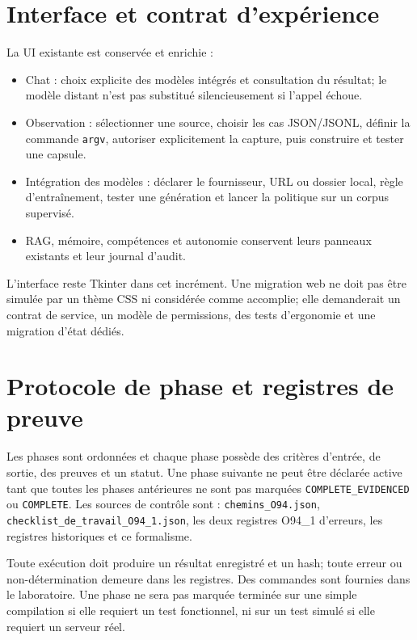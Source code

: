 \documentclass[11pt,a4paper]{article}
\begin{document}
\section{Interface et contrat d'expérience}
La UI existante est conservée et enrichie :
\begin{itemize}[nosep]
\item Chat : choix explicite des modèles intégrés et consultation du résultat; le modèle distant n'est pas substitué silencieusement si l'appel échoue.
\item Observation : sélectionner une source, choisir les cas JSON/JSONL, définir la commande \texttt{argv}, autoriser explicitement la capture, puis construire et tester une capsule.
\item Intégration des modèles : déclarer le fournisseur, URL ou dossier local, règle d'entraînement, tester une génération et lancer la politique sur un corpus supervisé.
\item RAG, mémoire, compétences et autonomie conservent leurs panneaux existants et leur journal d'audit.
\end{itemize}
L'interface reste Tkinter dans cet incrément. Une migration web ne doit pas être simulée par un thème CSS ni considérée comme accomplie; elle demanderait un contrat de service, un modèle de permissions, des tests d'ergonomie et une migration d'état dédiés.

\section{Protocole de phase et registres de preuve}
Les phases sont ordonnées et chaque phase possède des critères d'entrée, de sortie, des preuves et un statut. Une phase suivante ne peut être déclarée active tant que toutes les phases antérieures ne sont pas marquées \texttt{COMPLETE\_EVIDENCED} ou \texttt{COMPLETE}. Les sources de contrôle sont : \texttt{chemins\_O94.json}, \texttt{checklist\_de\_travail\_O94\_1.json}, les deux registres O94\_1 d'erreurs, les registres historiques et ce formalisme.

Toute exécution doit produire un résultat enregistré et un hash; toute erreur ou non-détermination demeure dans les registres. Des commandes sont fournies dans le laboratoire. Une phase ne sera pas marquée terminée sur une simple compilation si elle requiert un test fonctionnel, ni sur un test simulé si elle requiert un serveur réel.
\end{document}
